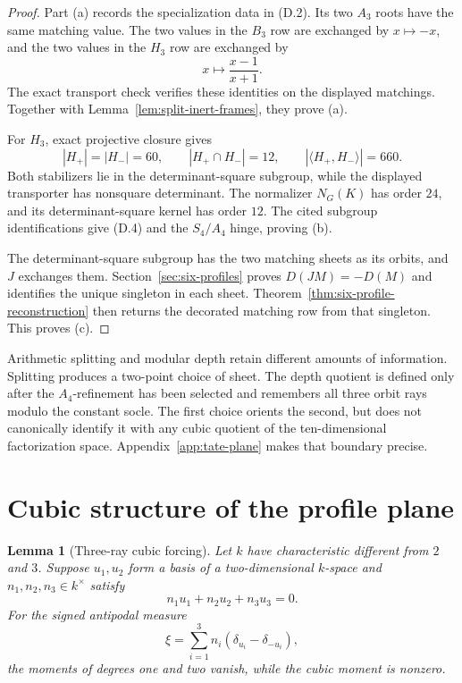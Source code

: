 \documentclass[11pt]{article}
\newtheorem{lemma}[theorem]{Lemma}
\theoremstyle{definition}
\theoremstyle{remark}
\begin{document}
\begin{proof}
Part (a) records the specialization data in (D.2).  Its two
\(A_3\) roots have the same matching value.  The two values in the
\(B_3\) row are exchanged by
\(x\mapsto-x\), and the two values in the \(H_3\) row are exchanged by
\[
 x\longmapsto\frac{x-1}{x+1}.
\]
The exact transport check verifies these identities on the displayed
matchings.  Together with Lemma~\ref{lem:split-inert-frames}, they prove
(a).

For $H_3$, exact projective closure gives
\[
 |H_+|=|H_-|=60,\qquad |H_+\cap H_-|=12,\qquad
 |\langle H_+,H_-\rangle|=660.
\]
Both stabilizers lie in the determinant-square subgroup, while the
displayed transporter has nonsquare determinant.  The normalizer
\(N_G(K)\) has order $24$, and its determinant-square kernel has order
$12$.  The cited subgroup identifications give (D.4) and the
$S_4/A_4$ hinge, proving (b).

The determinant-square subgroup has the two matching sheets as its
orbits, and $J$ exchanges them.  Section~\ref{sec:six-profiles} proves
$D(JM)=-D(M)$ and identifies the unique singleton in each sheet.
Theorem~\ref{thm:six-profile-reconstruction} then returns the decorated
matching row from that singleton.  This proves (c).
\end{proof}

Arithmetic splitting and modular depth retain different amounts of
information.  Splitting produces a two-point choice of sheet.  The
depth quotient is defined only after the $A_4$-refinement has been
selected and remembers all three orbit rays modulo the constant socle.
The first choice orients the second, but does not canonically identify
it with any cubic quotient of the ten-dimensional factorization space.
Appendix~\ref{app:tate-plane} makes that boundary precise.

\section{Cubic structure of the profile plane}
\label{app:profile-cubic}

\begin{lemma}[Three-ray cubic forcing]
\label{lem:three-ray-cubic}
Let \(k\) have characteristic different from \(2\) and \(3\).  Suppose
\(u_1,u_2\) form a basis of a two-dimensional \(k\)-space and
\(n_1,n_2,n_3\in k^\times\) satisfy
\[
 n_1u_1+n_2u_2+n_3u_3=0.
\]
For the signed antipodal measure
\[
 \xi=\sum_{i=1}^3 n_i(\delta_{u_i}-\delta_{-u_i}),
\]
the moments of degrees one and two vanish, while the cubic moment is
nonzero.
\end{lemma}
\end{document}
